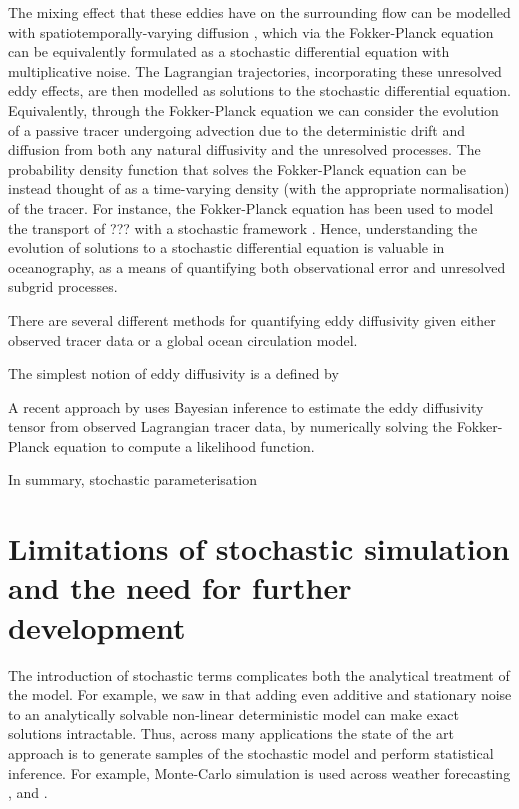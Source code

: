 The mixing effect that these eddies have on the surrounding flow can be modelled with spatiotemporally-varying diffusion \citehere, which via the Fokker-Planck equation can be equivalently formulated as a stochastic differential equation with multiplicative noise.
The Lagrangian trajectories, incorporating these unresolved eddy effects, are then modelled as solutions to the stochastic differential equation.
Equivalently, through the Fokker-Planck equation we can consider the evolution of a passive tracer undergoing advection due to the deterministic drift and diffusion from both any natural diffusivity and the unresolved processes.
The probability density function that solves the Fokker-Planck equation can be instead thought of as a time-varying density (with the appropriate normalisation) of the tracer.
For instance, the Fokker-Planck equation has been used to model the transport of ??? with a stochastic framework \citehere.
Hence, understanding the evolution of solutions to a stochastic differential equation is valuable in oceanography, as a means of quantifying both observational error and unresolved subgrid processes.


There are several different methods for quantifying eddy diffusivity given either observed tracer data or a global ocean circulation model.

The simplest notion of eddy diffusivity is a defined by






A recent approach by \cite{YingEtAl_2019_BayesianInferenceOcean} uses Bayesian inference to estimate the eddy diffusivity tensor from observed Lagrangian tracer data, by numerically solving the Fokker-Planck equation to compute a likelihood function.


In summary, stochastic parameterisation



\section{Limitations of stochastic simulation and the need for further development}\label{sec:bkg_sim_limits}
The introduction of stochastic terms complicates both the analytical treatment of the model.
For example, we saw in  that adding even additive and stationary noise to an analytically solvable non-linear deterministic model can make exact solutions intractable.
Thus, across many applications the state of the art approach is to generate samples of the stochastic model and perform statistical inference.
For example, Monte-Carlo simulation is used across weather forecasting \citep{LeutbecherEtAl_2017_StochasticRepresentationsModel},  and .

